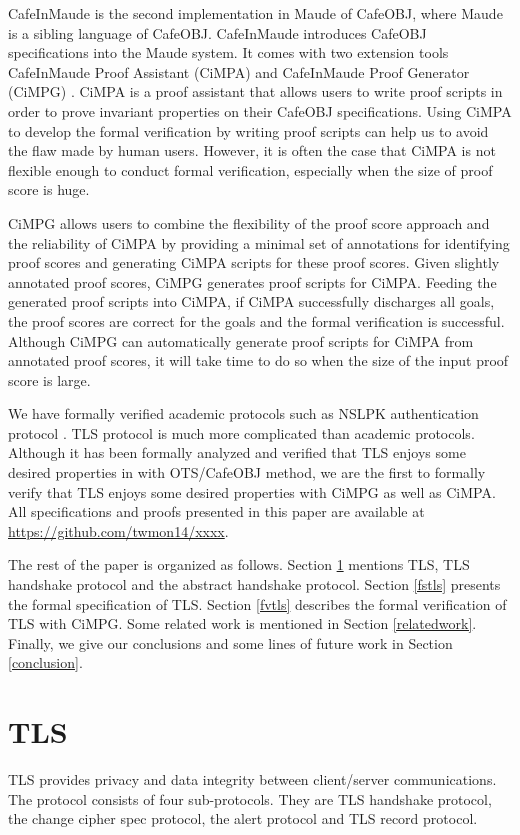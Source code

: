 \documentclass[a4paper,fleqn]{cas-dc}
\begin{document}
CafeInMaude is the second implementation in Maude of CafeOBJ, where Maude \cite{ClavelEtal2007maude} is a sibling language of CafeOBJ.
CafeInMaude introduces CafeOBJ specifications into the Maude system.
It comes with two extension tools CafeInMaude Proof Assistant (CiMPA) and CafeInMaude Proof Generator (CiMPG) \cite{RiescoO18tosem}. CiMPA is a proof assistant that allows users to write proof scripts in order to prove invariant properties on their CafeOBJ specifications. Using CiMPA to develop the formal verification by writing proof scripts can help us to avoid the flaw made by human users. However, it is often the case that CiMPA is not flexible enough to conduct formal verification, especially when the size of proof score is huge. 

CiMPG allows users to combine the flexibility of the proof score approach and the reliability of CiMPA by providing a minimal set of annotations for identifying proof scores and generating CiMPA scripts for these proof scores. Given slightly annotated proof scores, CiMPG generates proof scripts for CiMPA. Feeding the generated proof scripts into CiMPA, if CiMPA successfully discharges all goals, the proof scores are correct for the goals and the formal verification is successful. Although CiMPG can automatically generate proof scripts for CiMPA from annotated proof scores, it will take time to do so when the size of the input proof score is large.

We have formally verified academic protocols
such as NSLPK authentication protocol \cite{twmon}. TLS protocol is much more complicated than academic protocols. Although it has been formally analyzed and verified that TLS enjoys some desired properties in \cite{1437139} with OTS/CafeOBJ method, we are the first to formally verify that TLS enjoys some desired properties with CiMPG as  well as CiMPA. 
All specifications and proofs presented in this paper are available at \url{https://github.com/twmon14/xxxx}.

The rest of the paper is organized as follows. Section \ref{tls} mentions TLS, TLS handshake protocol and the abstract handshake protocol. Section \ref{fstls} presents the formal specification of TLS. Section \ref{fvtls} describes the formal verification of TLS with CiMPG. Some related work is mentioned in Section \ref{relatedwork}. Finally, we give our conclusions and some lines of future work in Section \ref{conclusion}.
	
\section{TLS}\label{tls}
TLS\cite{dierk} provides privacy and data integrity between client/server communications. The protocol consists of four sub-protocols. They are TLS handshake protocol, the change cipher spec protocol, the alert protocol and TLS record protocol. 
\end{document}
